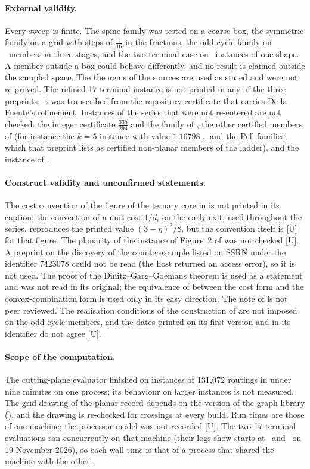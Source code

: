 \documentclass[11pt]{article}
\theoremstyle{remark}
\begin{document}
\paragraph{External validity.} Every sweep is finite. The spine family was tested on a coarse box, the symmetric family on a grid with steps of $\tfrac1{16}$ in the fractions, the odd-cycle family on \nsixtotal\ members in three stages, and the two-terminal case on \ntwoterm\ instances of one shape. A member outside a box could behave differently, and no result is claimed outside the sampled space. The theorems of the sources are used as stated and were not re-proved. The refined 17-terminal instance is not printed in any of the three preprints; it was transcribed from the repository certificate that carries De la Fuente's refinement. Instances of the series that were not re-entered are not checked: the integer certificate $\tfrac{335}{294}$ and the family of \cite{Pro26}, the other certified members of \cite{Nik3} (for instance the $k=5$ instance with value $1.16798\ldots$ and the Pell families, which that preprint lists as certified non-planar members of the ladder), and the instance of \cite{BLRT26}.

\paragraph{Construct validity and unconfirmed statements.} The cost convention of the figure of the ternary core in \cite{Nik3} is not printed in its caption; the convention of a unit cost $1/d_i$ on the early exit, used throughout the series, reproduces the printed value $(3-\eta)^2/8$, but the convention itself is [U] for that figure. The planarity of the instance of Figure~2 of \cite{BLRT26} was not checked [U]. A preprint on the discovery of the counterexample listed on SSRN under the identifier 7423078 could not be read (the host returned an access error), so it is not used.
The proof of the Dinitz--Garg--Goemans theorem is used as a statement and was not read in its original; the equivalence of \cite{MSS07} between the cost form and the convex-combination form is used only in its easy direction. The note of \cite{Muf26} is not peer reviewed. The realisation conditions of the construction of \cite{Afr26} are not imposed on the odd-cycle members, and the dates printed on its first version and in its identifier do not agree [U].

\paragraph{Scope of the computation.} The cutting-plane evaluator finished on instances of $131{,}072$ routings in under nine minutes on one process; its behaviour on larger instances is not measured. The grid drawing of the planar record depends on the version of the graph library (\nnetworkx), and the drawing is re-checked for crossings at every build. Run times are those of one machine; the processor model was not recorded [U]. The two 17-terminal evaluations ran concurrently on that machine (their logs show starts at \nkrecstart\ and \nkrefstart\ on 19 November 2026), so each wall time is that of a process that shared the machine with the other.
\end{document}
